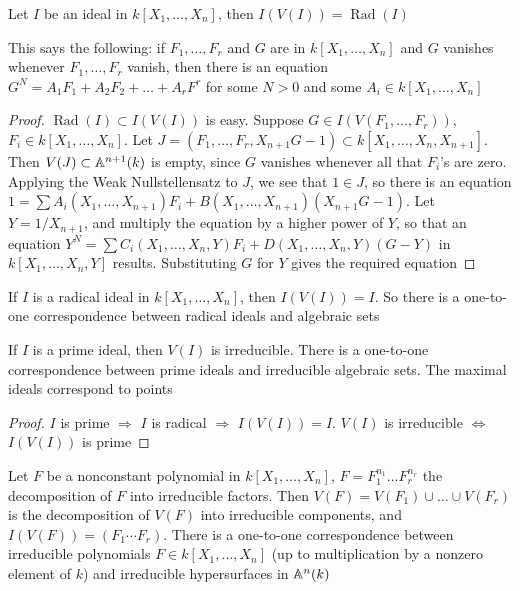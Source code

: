 \documentclass[11pt]{article}
\DeclareMathOperator{\Rad}{\text{Rad}}
\begin{document}
\begin{theorem}
Let \(I\) be an ideal in \(k[X_1,\dots,X_n]\), then \(I(V(I))=\Rad(I)\)
\end{theorem}

This says the following: if \(F_1,\dots,F_r\) and \(G\) are in \(k[X_1,\dots,X_n]\) and \(G\) vanishes
whenever \(F_1,\dots,F_r\) vanish, then there is an equation \(G^N=A_1F_1+A_2F_2+\dots+A_rF^r\) for some \(N>0\)
and some \(A_i\in k[X_1,\dots,X_n]\)

\begin{proof}
\(\Rad(I)\subset I(V(I))\) is easy. Suppose \(G\in I(V(F_1,\dots,F_r))\), \(F_i\in k[X_1,\dots,X_n]\).
Let \(J=(F_1,\dots,F_r,X_{n+1}G-1)\subset k[X_1,\dots,X_n,X_{n+1}]\). Then \(V(J)\subset\mathbb{A}^{n+1}(k)\) is empty,
since \(G\) vanishes whenever all that \(F_i\)'s are zero. Applying the Weak Nullstellensatz
to \(J\), we see that \(1\in J\), so there is an
equation \(1=\sum A_i(X_1,\dots,X_{n+1})F_i+B(X_1,\dots,X_{n+1})(X_{n+1}G-1)\). Let \(Y=1/X_{n+1}\), and
multiply the equation by a higher power of \(Y\), so that an equation
\(Y^N=\sum C_i(X_1,\dots,X_n,Y)F_i+D(X_1,\dots,X_n,Y)(G-Y)\) in \(k[X_1,\dots,X_n,Y]\) results. Substituting \(G\)
for \(Y\) gives the required equation
\end{proof}

\begin{corollary}[]
If \(I\) is a radical ideal in \(k[X_1,\dots,X_n]\), then \(I(V(I))=I\). So there is a one-to-one
correspondence between radical ideals and algebraic sets
\end{corollary}

\begin{corollary}[]
If \(I\) is a prime ideal, then \(V(I)\) is irreducible. There is a one-to-one correspondence
between prime ideals and irreducible algebraic sets. The maximal ideals correspond to points
\end{corollary}

\begin{proof}
\(I\) is prime \(\Rightarrow\) \(I\) is radical \(\Rightarrow\) \(I(V(I))=I\). \(V(I)\) is irreducible \(\Leftrightarrow\) \(I(V(I))\) is prime
\end{proof}

\begin{corollary}[]
Let \(F\) be a nonconstant polynomial in \(k[X_1,\dots,X_n]\), \(F=F_1^{n_1}\dots F_r^{n_r}\) the
decomposition of \(F\) into irreducible factors. Then \(V(F)=V(F_1)\cup\dots\cup V(F_r)\) is the decomposition
of \(V(F)\) into irreducible components, and \(I(V(F))=(F_1\cdots F_r)\). There is a one-to-one
correspondence between irreducible polynomials \(F\in k[X_1,\dots,X_n]\) (up to multiplication by a
nonzero element of \(k\)) and irreducible hypersurfaces in \(\mathbb{A}^n(k)\)
\end{corollary}
\end{document}
